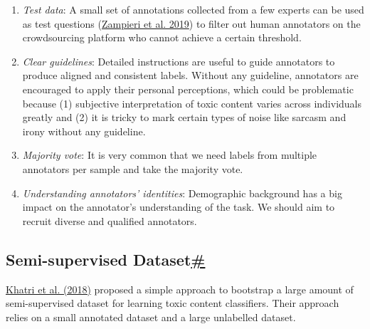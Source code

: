 \begin{enumerate}
\tightlist
\item
  \emph{Test data}: A small set of annotations collected from a few experts can be used as test questions (\href{https://arxiv.org/abs/1902.09666}{Zampieri et al. 2019}) to filter out human annotators on the crowdsourcing platform who cannot achieve a certain threshold.
\item
  \emph{Clear guidelines}: Detailed instructions are useful to guide annotators to produce aligned and consistent labels. Without any guideline, annotators are encouraged to apply their personal perceptions, which could be problematic because (1) subjective interpretation of toxic content varies across individuals greatly and (2) it is tricky to mark certain types of noise like sarcasm and irony without any guideline.
\item
  \emph{Majority vote}: It is very common that we need labels from multiple annotators per sample and take the majority vote.
\item
  \emph{Understanding annotators' identities}: Demographic background has a big impact on the annotator's understanding of the task. We should aim to recruit diverse and qualified annotators.
\end{enumerate}

\subsection{\texorpdfstring{Semi-supervised Dataset\hyperref[semi-supervised-dataset]{\#}}{Semi-supervised Dataset\#}}\label{semi-supervised-dataset}

\href{https://arxiv.org/abs/1811.12900}{Khatri et al. (2018)} proposed a simple approach to bootstrap a large amount of semi-supervised dataset for learning toxic content classifiers. Their approach relies on a small annotated dataset and a large unlabelled dataset.

